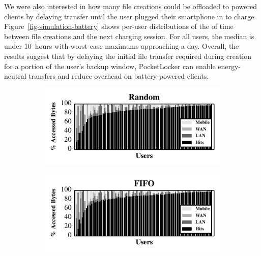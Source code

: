 We were also interested in how many file creations could be offloaded to
powered clients by delaying transfer until the user plugged their smartphone
in to charge. Figure~\ref{fig-simulation-battery} shows per-user
distributions of the of time between file creations and the next charging
session. For all users, the median is under 10~hours with worst-case maximums
approaching a day. Overall, the results suggest that by delaying the initial
file transfer required during creation for a portion of the user's backup
window, PocketLocker can enable energy-neutral transfers and reduce overhead
on battery-powered clients.

\begin{figure}[t]

  \begin{subfigure}[t]{0.5\columnwidth}

    \includegraphics[width=\columnwidth]{./figures/pocketlocker/RandomSimulatorPerformanceGraph.pdf}

  \end{subfigure}%
  \begin{subfigure}[t]{0.5\columnwidth}

    \includegraphics[width=\columnwidth]{./figures/pocketlocker/FIFOSimulatorPerformanceGraph.pdf}

  \end{subfigure}\\
  \begin{subfigure}[t]{0.5\columnwidth}


\end{subfigure}
\end{figure}
